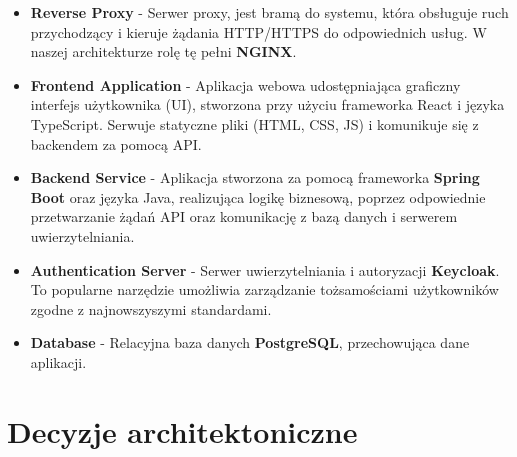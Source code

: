 \begin{itemize} 
    \item \textbf{Reverse Proxy} - Serwer proxy, jest bramą do systemu, która obsługuje ruch przychodzący i kieruje żądania HTTP/HTTPS do odpowiednich usług. W naszej architekturze rolę tę pełni \textbf{NGINX}.
    \item \textbf{Frontend Application} - Aplikacja webowa udostępniająca graficzny interfejs użytkownika (UI), stworzona przy użyciu frameworka React i języka TypeScript. Serwuje statyczne pliki (HTML, CSS, JS) i komunikuje się z backendem za pomocą API.
    \item \textbf{Backend Service} - Aplikacja stworzona za pomocą frameworka \textbf{Spring Boot} oraz języka Java, realizująca logikę biznesową, poprzez odpowiednie przetwarzanie żądań API oraz komunikację z bazą danych i serwerem uwierzytelniania.
    \item \textbf{Authentication Server} - Serwer uwierzytelniania i autoryzacji \textbf{Keycloak}. To popularne narzędzie umożliwia zarządzanie tożsamościami użytkowników zgodne z najnowszyszymi standardami.
    \item \textbf{Database} - Relacyjna baza danych \textbf{PostgreSQL}, przechowująca dane aplikacji.
\end{itemize}

\section{Decyzje architektoniczne}

